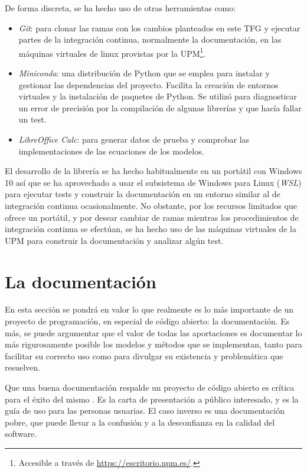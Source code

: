 De forma discreta, se ha hecho uso de otras herramientas como:

\begin{itemize}
    \item \textit{Git}: para clonar las ramas con los cambios planteados en este TFG y ejecutar partes de la integración continua, normalmente la documentación, en las máquinas virtuales de linux provistas por la UPM\footnote{Accesible a través de \url{https://escritorio.upm.es/}.}.
    \item \textit{Miniconda}: una distribución de Python que se emplea para instalar y gestionar las dependencias del proyecto. Facilita la creación de entornos virtuales y la instalación de paquetes de Python. Se utilizó para diagnosticar un error de precisión por la compilación de algunas librerías y que hacía fallar un test.
    \item \textit{LibreOffice Calc}: para generar datos de prueba y comprobar las implementaciones de las ecuaciones de los modelos.
\end{itemize}

El desarrollo de la librería se ha hecho habitualmente en un portátil con Windows 10 así que se ha aprovechado a usar el subsistema de Windows para Linux (\textit{WSL}) para ejecutar tests y construir la documentación en un entorno similar al de integración continua ocasionalmente. No obstante, por los recursos limitados que ofrece un portátil, y por desear cambiar de ramas mientras los procedimientos de integración continua se efectúan, se ha hecho uso de las máquinas virtuales de la UPM para construir la documentación y analizar algún test.

\section{La documentación}

En esta sección se pondrá en valor lo que realmente es lo más importante de un proyecto de programación, en especial de código abierto: la documentación. Es más, se puede argumentar que el valor de todas las aportaciones es documentar lo más rigurosamente posible los modelos y métodos que se implementan, tanto para facilitar su correcto uso como para divulgar su existencia y problemática que resuelven.

Que una buena documentación respalde un proyecto de código abierto es crítica para el éxito del mismo \cite{Imani_Radmanesh_Ahmed_Moshirpour_2024}. Es la carta de presentación a público interesado, y es la guía de uso para las personas usuarias. El caso inverso es una documentación pobre, que puede llevar a la confusión y a la desconfianza en la calidad del software.

